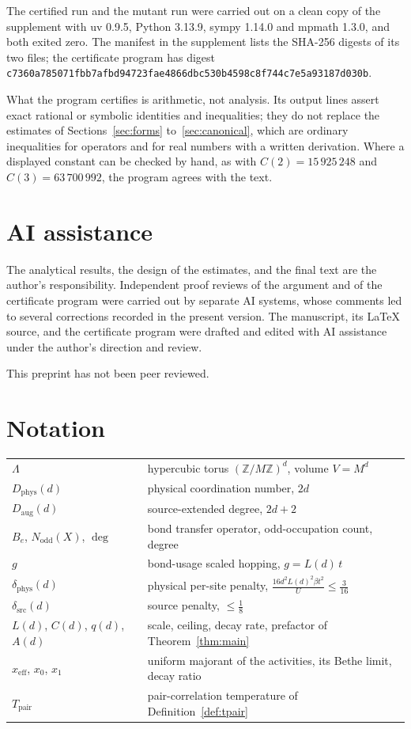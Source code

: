 \documentclass[11pt]{article}
\theoremstyle{plain}
\theoremstyle{definition}
\newcommand{\Nodd}{N_{\mathrm{odd}}}
\newcommand{\Dphys}{D_{\mathrm{phys}}}
\newcommand{\Daug}{D_{\mathrm{aug}}}
\begin{document}
The certified run and the mutant run were carried out on a clean copy of the
supplement with uv 0.9.5, Python 3.13.9, sympy 1.14.0 and mpmath 1.3.0, and both
exited zero. The manifest in the supplement lists the SHA-256 digests of its two files;
the certificate program has digest
\texttt{c7360a785071fbb7afbd94723fae4866dbc530b4598c8f744c7e5a93187d030b}.

What the program certifies is arithmetic, not analysis. Its output lines assert exact
rational or symbolic identities and inequalities; they do not replace the estimates of Sections~\ref{sec:forms} to~\ref{sec:canonical},
which are ordinary inequalities for
operators and for real numbers with a written derivation. Where a displayed constant
can be checked by hand, as with $C(2)=15\,925\,248$ and $C(3)=63\,700\,992$, the
program agrees with the text.

\section*{AI assistance}

The analytical results, the design of the estimates, and the final text are the
author's responsibility. Independent proof reviews of the argument and of the
certificate program were carried out by separate AI systems, whose comments led to
several corrections recorded in the present version. The manuscript, its LaTeX
source, and the certificate program were drafted and edited with AI assistance under
the author's direction and review.

This preprint has not been peer reviewed.

\appendix

\section{Notation}\label{app:notation}

\begin{tabular}{@{}ll@{}}
$\Lambda$ & hypercubic torus $(\mathbb Z/M\mathbb Z)^d$, volume $V=M^d$\\
$\Dphys(d)$ & physical coordination number, $2d$\\
$\Daug(d)$ & source-extended degree, $2d+2$\\
$B_e$, $\Nodd(X)$, $\deg$ & bond transfer operator, odd-occupation count, degree\\
$g$ & bond-usage scaled hopping, $g=L(d)\,t$\\
$\delta_{\mathrm{phys}}(d)$ & physical per-site penalty, $\frac{16d^2L(d)^2\beta t^2}{U}\le\frac{3}{16}$\\
$\delta_{\mathrm{src}}(d)$ & source penalty, $\le\frac{1}{8}$\\
$L(d)$, $C(d)$, $q(d)$, $A(d)$ & scale, ceiling, decay rate, prefactor of Theorem~\ref{thm:main}\\
$x_{\mathrm{eff}}$, $x_0$, $x_1$ & uniform majorant of the activities, its Bethe limit, decay ratio\\
$T_{\mathrm{pair}}$ & pair-correlation temperature of Definition~\ref{def:tpair}\\
\end{tabular}



\end{document}

